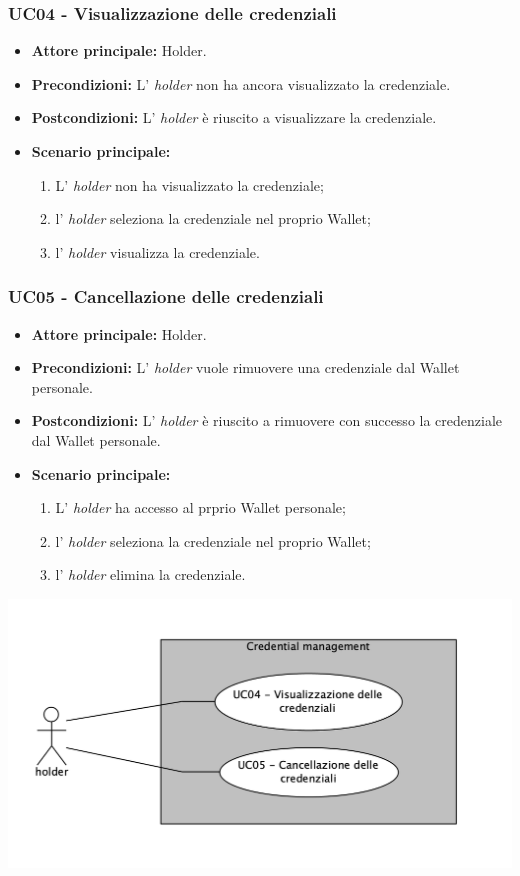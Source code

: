 \subsubsection{UC04 - Visualizzazione delle credenziali}
\begin{itemize}
\item \textbf{Attore principale:} Holder.
\item \textbf{Precondizioni:} L’ \textit{holder} non ha ancora visualizzato la credenziale.
\item \textbf{Postcondizioni:} L’ \textit{holder} è riuscito a visualizzare la credenziale.
\item \textbf{Scenario principale:} 
    \begin{enumerate}
        \item L' \textit{holder} non ha visualizzato la credenziale; 
        \item l' \textit{holder} seleziona la credenziale nel proprio Wallet;
        \item l' \textit{holder} visualizza la credenziale.
    \end{enumerate}
\end{itemize}

\subsubsection{UC05 - Cancellazione delle credenziali}
\begin{itemize}
\item \textbf{Attore principale:} Holder.
\item \textbf{Precondizioni:} L’ \textit{holder} vuole rimuovere una credenziale dal Wallet personale.
\item \textbf{Postcondizioni:} L’ \textit{holder} è riuscito a rimuovere con successo la credenziale dal Wallet personale.
\item \textbf{Scenario principale:} 
    \begin{enumerate}
        \item L' \textit{holder} ha accesso al prprio Wallet personale; 
        \item l' \textit{holder} seleziona la credenziale nel proprio Wallet;
        \item l' \textit{holder} elimina la credenziale.
    \end{enumerate}
\end{itemize}
\begin{center}
    \includegraphics[scale = 0.65]{./res/img/credentialManagement.png}
\end{center}


